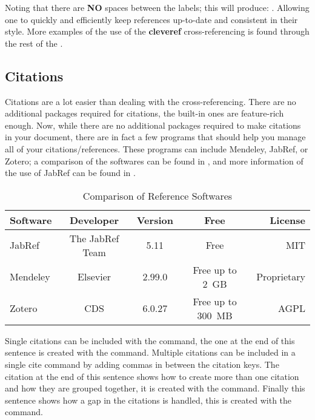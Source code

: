     Noting that there are \textbf{NO} spaces between the labels; this will produce: . Allowing one to quickly and efficiently keep references up-to-date and consistent in their style.
    More examples of the use of the \textbf{cleveref} cross-referencing is found through the rest of the .
  \subsection{Citations}\label{subsec:citations}
      Citations are a lot easier than dealing with the cross-referencing.
      There are no additional packages required for citations, the built-in ones are feature-rich enough.
      Now, while there are no additional packages required to make citations in your document, there are in fact a few programs that should help you manage all of your citations/references.
      These programs can include Mendeley, JabRef, or Zotero; a comparison of the softwares can be found in , and more information of the use of JabRef can be found in .
      
      \begin{table}[htbp]
          \centering
          \caption{Comparison of Reference Softwares}\label{tab:refSoftware}%
            \begin{tabularx}{0.9\textwidth}{Lcccr}
                \toprule
                    Software & Developer & Version & Free & License \\
                \midrule
                    JabRef   & The JabRef Team & 5.11   & Free   & MIT \\
                    Mendeley & Elsevier          & 2.99.0 & {Free up to 2 GB} & Proprietary \\
                    Zotero   & CDS               & 6.0.27 & {Free  up to 300 MB} & AGPL \\
                \bottomrule
            \end{tabularx}%
      \end{table}%
      
      Single citations can be included with the  command, the one at the end of this sentence is created with the  command\cite{TEST}. 
      Multiple citations can be included in a single cite command by adding commas in between the citation keys. The citation at the end of this sentence shows how to create more than one citation and how they are grouped together, it is created with the  command\cite{testone,cite2,cite3,cite4,cite5}.
      Finally this sentence shows how a gap in the citations is handled, this is created with the command\cite{testone,cite2,cite3,cite5}. 
